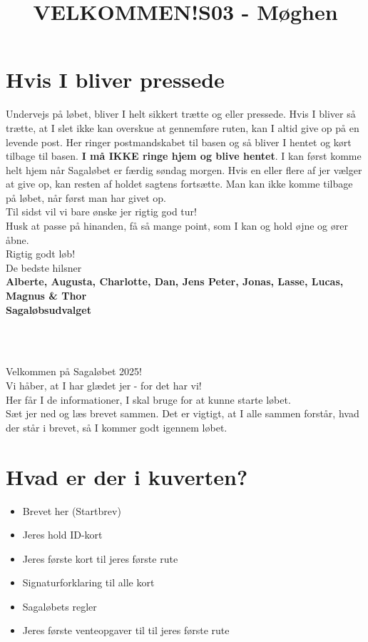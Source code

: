 \section{Hvis I bliver pressede}
Undervejs på løbet, bliver I helt sikkert trætte og eller pressede. Hvis I bliver så trætte, at I slet ikke kan overskue at gennemføre ruten, kan I altid give op på en levende post. Her ringer postmandskabet til basen og så bliver I hentet og kørt tilbage til basen. \textbf{I må IKKE ringe hjem og blive hentet}. I kan først komme helt hjem når Sagaløbet er færdig søndag morgen. Hvis en eller flere af jer vælger at give op, kan resten af holdet sagtens fortsætte. Man kan ikke komme tilbage på løbet, når først man har givet op.\\
\newline
Til sidst vil vi bare ønske jer rigtig god tur!\\
Husk at passe på hinanden, få så mange point, som I kan og hold øjne og ører åbne.\\
\newline
Rigtig godt løb!\\
\newline
\textcolor{søblå}{De bedste hilsner}\\
\textcolor{natblå}{\textbf{Alberte, Augusta, Charlotte, Dan, Jens Peter, Jonas, Lasse, Lucas, Magnus \& Thor}}\\
\textcolor{natblå}{\textbf{Sagaløbsudvalget}}\\
\newpage
\title{VELKOMMEN!}\\
\newline
\title{\textcolor{flammefarvet}{S03 - Møghen }}\\
\newline
Velkommen på Sagaløbet 2025!\\
Vi håber, at I har glædet jer - for det har vi!\\
Her får I de informationer, I skal bruge for at kunne starte løbet.\\
Sæt jer ned og læs brevet sammen. Det er vigtigt, at I alle sammen forstår, hvad der står i brevet, så I kommer godt igennem løbet.
\section{Hvad er der i kuverten?}
\begin{itemize}
    \item Brevet her (Startbrev)
    \item Jeres hold ID-kort
    \item Jeres første kort til jeres første rute
    \item Signaturforklaring til alle kort
    \item Sagaløbets regler
    \item Jeres første venteopgaver til til jeres første rute
\end{itemize}
